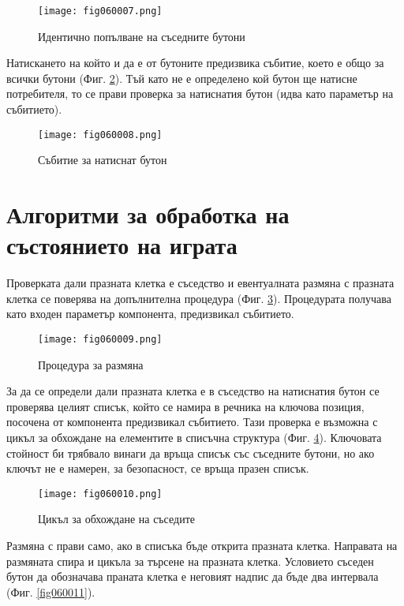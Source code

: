 \begin{figure}[H]
  \centering
  \texttt{[image: fig060007.png]}
  \caption{Идентично попълване на съседните бутони}
\label{fig060007}
\end{figure}

Натискането на който и да е от бутоните предизвика събитие, което е общо за всички бутони (Фиг. \ref{fig060008}). Тъй като не е определено кой бутон ще натисне потребителя, то се прави проверка за натиснатия бутон (идва като параметър на събитието). 

\begin{figure}[H]
  \centering
  \texttt{[image: fig060008.png]}
  \caption{Събитие за натиснат бутон}
\label{fig060008}
\end{figure}

\section{Алгоритми за обработка на състоянието на играта}

Проверката дали празната клетка е съседство и евентуалната размяна с празната клетка се поверява на допълнителна процедура (Фиг. \ref{fig060009}). Процедурата получава като входен параметър компонента, предизвикал събитието. 

\begin{figure}[H]
  \centering
  \texttt{[image: fig060009.png]}
  \caption{Процедура за размяна}
\label{fig060009}
\end{figure}

За да се определи дали празната клетка е в съседство на натиснатия бутон се проверява целият списък, който се намира в речника на ключова позиция, посочена от компонента предизвикал събитието. Тази проверка е възможна с цикъл за обхождане на елементите в списъчна структура (Фиг. \ref{fig060010}). Ключовата стойност би трябвало винаги да връща списък със съседните бутони, но ако ключът не е намерен, за безопасност, се връща празен списък.

\begin{figure}[H]
  \centering
  \texttt{[image: fig060010.png]}
  \caption{Цикъл за обхождане на съседите}
\label{fig060010}
\end{figure}

Размяна с прави само, ако в списъка бъде открита празната клетка. Направата на размяната спира и цикъла за търсене на празната клетка. Условието съседен бутон да обозначава праната клетка е неговият надпис да бъде два интервала (Фиг. \ref{fig060011}). 

